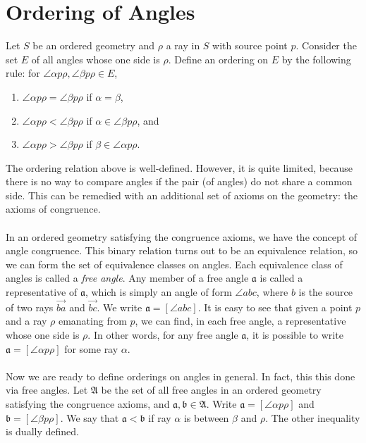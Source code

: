 \documentclass[12pt]{article}
\newcommand{\ray}[1]{\overrightarrow{#1}}
\begin{document}
\section{Ordering of Angles}
Let $S$ be an ordered geometry and $\rho$ a ray in $S$ with source
point $p$.  Consider the set $E$ of all angles whose one side is
$\rho$.  Define an ordering on $E$ by the following rule: for
$\angle \alpha p\rho,\angle \beta p\rho\in E$,
\begin{enumerate}
\item $\angle\alpha p\rho=\angle\beta p\rho$ if $\alpha=\beta$,
\item $\angle\alpha p\rho<\angle\beta p\rho$ if $\alpha\in\angle\beta p\rho$, and
\item $\angle\alpha p\rho>\angle\beta p\rho$ if $\beta\in\angle\alpha p\rho$.
\end{enumerate}
The ordering relation above is well-defined.  However, it is quite
limited, because there is no way to compare angles if the pair (of
angles) do not share a common side.  This can be remedied with an
additional set of axioms on the geometry: the axioms of congruence.
\\\\
In an ordered geometry satisfying the congruence axioms, we have the
concept of angle congruence. This binary relation turns out to be an
equivalence relation, so we can form the set of equivalence classes
on angles. Each equivalence class of angles is called a \emph{free
angle}.  Any member of a free angle $\mathfrak{a}$ is called a
representative of $\mathfrak{a}$, which is simply an angle of form
$\angle abc$, where $b$ is the source of two rays $\ray{ba}$ and
$\ray{bc}$.  We write $\mathfrak{a}=[\angle abc]$.  It is easy to
see that given a point $p$ and a ray $\rho$ emanating from $p$, we
can find, in each free angle, a representative whose one side is
$\rho$. In other words, for any free angle $\mathfrak{a}$, it is
possible to write $\mathfrak{a}=[\angle \alpha p\rho]$ for some ray
$\alpha$.
\\\\
Now we are ready to define orderings on angles in general.  In fact,
this this done via free angles.  Let $\mathfrak{A}$ be the set of
all free angles in an ordered geometry satisfying the congruence
axioms, and $\mathfrak{a},\mathfrak{b}\in\mathfrak{A}$.  Write
$\mathfrak{a}=[\angle \alpha p\rho]$ and $\mathfrak{b}=[\angle \beta
p\rho]$. We say that $\mathfrak{a}<\mathfrak{b}$ if ray $\alpha$ is
between $\beta$ and $\rho$.  The other inequality is dually defined.
\end{document}
